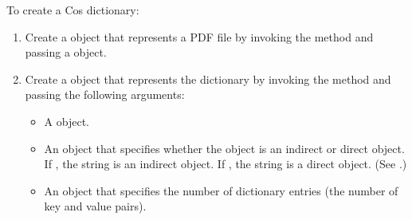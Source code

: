 \documentclass[letterpaper,12pt,english,openany,oneside]{sphinxmanual}
\begin{document}
To create a Cos dictionary:
\begin{enumerate}
%
\item {} 
Create a  object that represents a PDF file by invoking the  method and passing a  object.

\item {} 
Create a  object that represents the dictionary by invoking the  method and passing the following arguments:
\begin{itemize}
\item {} 
A  object.

\item {} 
An  object that specifies whether the  object is an indirect or direct object. If , the string is an indirect object. If , the string is a direct object. (See .)

\item {} 
An  object that specifies the number of dictionary entries (the number of key and value pairs).

\end{itemize}

\end{enumerate}
\end{document}
